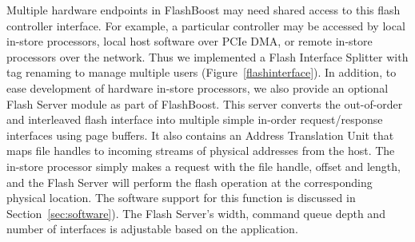 Multiple hardware endpoints in FlashBoost may need shared access to this
flash controller interface. For example, a particular controller may
be accessed by local in-store processors, local host software over PCIe
DMA, or remote in-store processors over the network. Thus we implemented a
Flash Interface Splitter with tag renaming to manage multiple users (Figure~\ref{flashinterface}). In addition, 
to ease development of hardware in-store processors,
we also provide an optional Flash Server module as part of FlashBoost. This server
converts the out-of-order and interleaved flash interface into
multiple simple in-order request/response interfaces
using page buffers. It also contains an Address Translation Unit that 
maps file handles to incoming streams of physical addresses from the host. The in-store processor
simply makes a request with the file handle, offset and length, and the Flash Server will perform
the flash operation at the corresponding physical location. The software
support for this function is discussed in Section~\ref{sec:software}). The Flash
Server's width, command queue depth and number of interfaces is adjustable 
based on the application.

